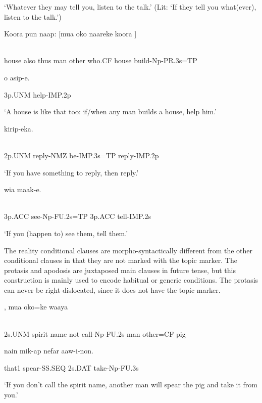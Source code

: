 `Whatever they may tell you, listen to the talk.' (Lit: `If they tell you what(ever), listen to the talk.')

\ea%
\label{ex:x1651}
\gll Koora  pun  naap:  [mua  oko  naareke  koora  ] \\
      \\
\glt
\z

house  also  thus  man  other  who.CF  house  build-Np-PR.3s=TP

o  asip-e.

3p.UNM  help-IMP.2p

`A house is like that too: if/when any man builds a house, help him.'

\ea%
\label{ex:x1656}
\gll [Ni  kirip-owa  \textstyleEmphasizedVernacularWords{ika-inok}=\textstyleEmphasizedVernacularWords{na}]  kirip-eka. \\
      \\
\glt
\z

2p.UNM  reply-NMZ  be-IMP.3s=TP  reply-IMP.2p

`If you have something to reply, then reply.'

\ea%
\label{ex:x1657}
\gll [Wia  \textstyleEmphasizedVernacularWords{uruf-i-nan=na}]  wia  maak-e. \\
      \\
\glt
\z

3p.ACC  see-Np-FU.2s=TP  3p.ACC  tell-IMP.2s

`If you (happen to) see them, tell them.'

The reality conditional clauses are morpho-syntactically different from the other conditional clauses in that they are not marked with the topic marker. The protasis and apodosis are juxtaposed main clauses in future tense, but this construction is mainly used to encode habitual or generic conditions. The protasis can never be right-dislocated, since it does not have the topic marker. 

\ea%
\label{ex:x1644}
,  mua  oko=ke  waaya \\
      \\
\glt
\z

2s.UNM  spirit  name  not  call-Np-FU.2s  man  other=CF  pig

nain  mik-ap  nefar  aaw-i-non.

that1  spear-SS.SEQ  2s.DAT  take-Np-FU.3s

`If you don't call the spirit name, another man will spear the pig and take it from you.'

